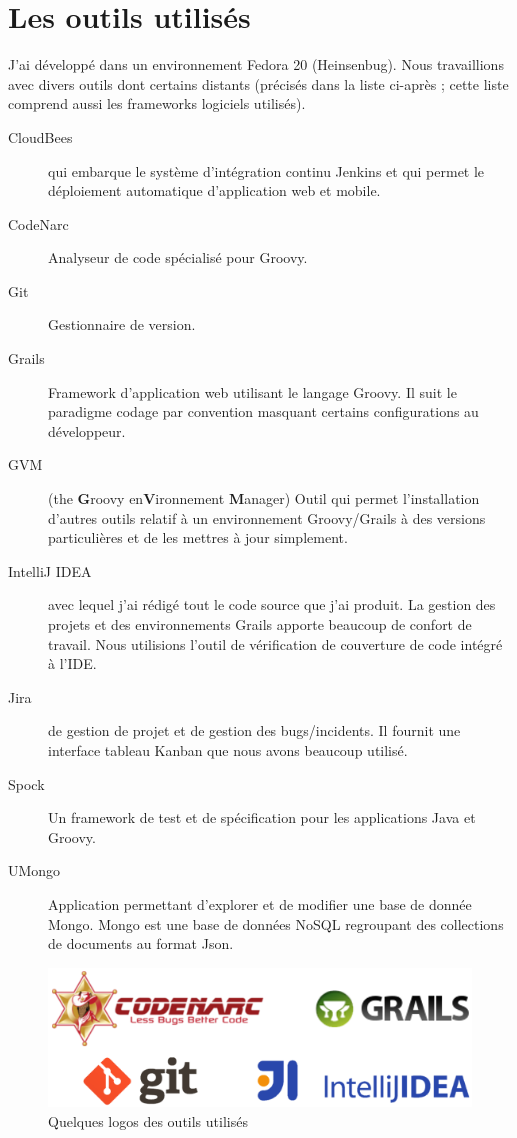 \section{Les outils utilisés}
J'ai développé dans un environnement Fedora 20 (Heinsenbug).
Nous travaillions avec divers outils dont certains distants (précisés dans la
liste ci-après ; cette liste comprend aussi les frameworks logiciels utilisés).
\begin{description}
  \item[CloudBees]  qui embarque le système d'intégration continu
	Jenkins et qui permet le déploiement automatique d'application web et
	mobile.
  \item[CodeNarc] Analyseur de code spécialisé pour Groovy.
  \item[Git] Gestionnaire de version.
  \item[Grails] Framework d'application web utilisant le langage Groovy. Il suit
	le paradigme \og codage par convention \fg{} masquant certains
	configurations au développeur.
  \item[GVM] (the {\bf G}roovy en{\bf V}ironnement {\bf M}anager) Outil qui
	permet l'installation d'autres outils relatif à un environnement
	Groovy/Grails à des versions particulières et de les mettres à jour
	simplement.
  \item[IntelliJ IDEA]  avec lequel j'ai rédigé tout le code source
	que j'ai produit. La gestion des projets et des environnements Grails
	apporte beaucoup de confort de travail. Nous utilisions l'outil de
	vérification de couverture de code intégré à l'IDE.
  \item[Jira]  de gestion de projet et de gestion des bugs/incidents. Il
	fournit une interface \og tableau Kanban \fg{} que nous avons beaucoup utilisé.
  \item[Spock] Un framework de test et de spécification pour les applications
	Java et Groovy.
  \item[UMongo] Application permettant d'explorer et de modifier une base de
	donnée Mongo. Mongo est une base de données NoSQL regroupant des collections
	de documents au format Json.
\end{description}

\begin{figure}[h]
  \centering
  \includegraphics[width=15cm]{images/logos}
  \caption{Quelques logos des outils utilisés}
  \label{fig:logos}
\end{figure}
